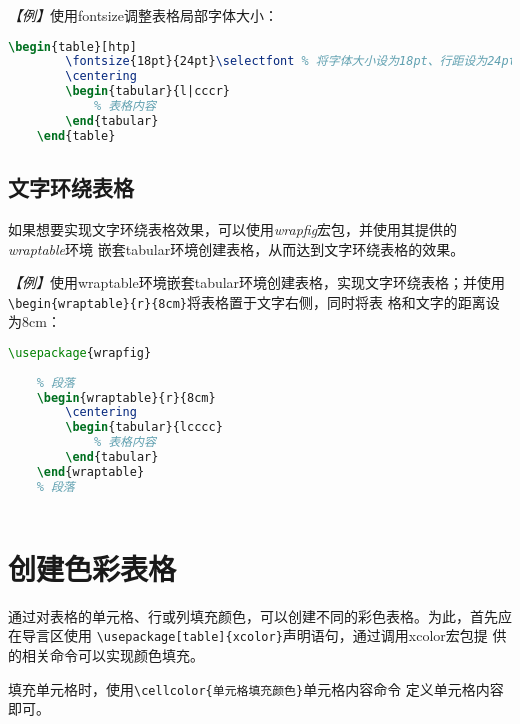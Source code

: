 \emph{【例】}使用fontsize调整表格局部字体大小：
\begin{lstlisting}[language=TeX]
    \begin{table}[htp]
        \fontsize{18pt}{24pt}\selectfont % 将字体大小设为18pt、行距设为24pt
        \centering
        \begin{tabular}{l|cccr}
            % 表格内容
        \end{tabular}
    \end{table}
\end{lstlisting}

\subsection{文字环绕表格}

如果想要实现文字环绕表格效果，可以使用\emph{wrapfig}宏包，并使用其提供的\emph{wraptable}环境
嵌套tabular环境创建表格，从而达到文字环绕表格的效果。

\emph{【例】}使用wraptable环境嵌套tabular环境创建表格，实现文字环绕表格；并使用
\texttt{\textbackslash{}begin\{wraptable\}\{r\}\{8cm\}}将表格置于文字右侧，同时将表
格和文字的距离设为8cm：

\begin{lstlisting}[language=TeX]
    \usepackage{wrapfig}
    
    % 段落
    \begin{wraptable}{r}{8cm}
        \centering
        \begin{tabular}{lcccc}
            % 表格内容
        \end{tabular}
    \end{wraptable}
    % 段落
    
\end{lstlisting}

\section{创建色彩表格}
通过对表格的单元格、行或列填充颜色，可以创建不同的彩色表格。为此，首先应在导言区使用
\texttt{\textbackslash{}usepackage[table]\{xcolor\}}声明语句，通过调用xcolor宏包提
供的相关命令可以实现颜色填充。

填充单元格时，使用\texttt{\textbackslash{}cellcolor\{单元格填充颜色\}}单元格内容命令
定义单元格内容即可。


